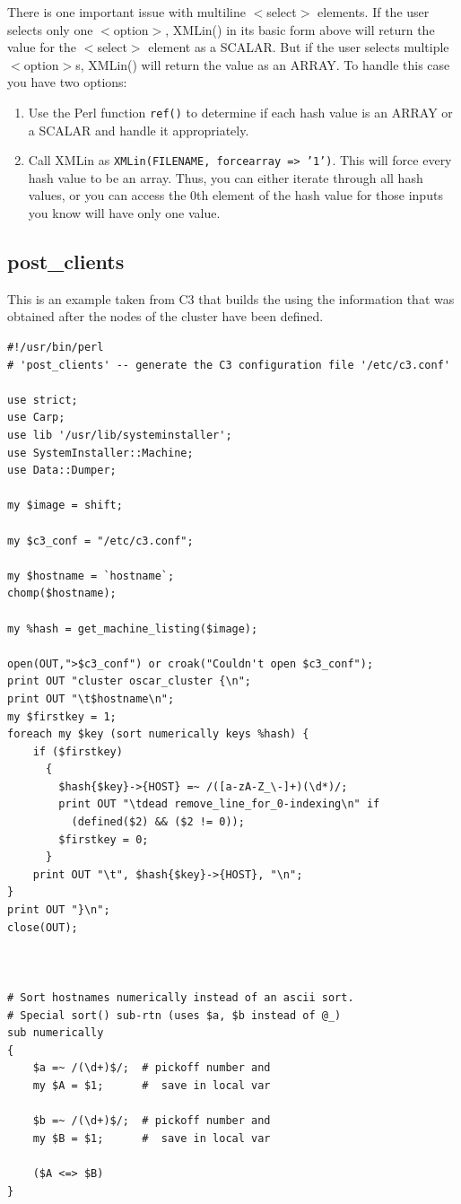 There is one important issue with multiline $<$select$>$ elements.  If the
user selects only one $<$option$>$, XMLin() in its basic form above will
return the value for the $<$select$>$ element as a SCALAR.  But if the user
selects multiple $<$option$>$s, XMLin() will return the value as an ARRAY.
To handle this case you have two options:

\begin{enumerate}
\item Use the Perl function \texttt{ref()} to determine if each hash value is
an ARRAY or a SCALAR and handle it appropriately.  
\item Call XMLin as \texttt{XMLin(FILENAME, forcearray => '1')}.  This will
force every hash value to be an array.  Thus, you can either iterate through
all hash values, or you can access the 0th element of the hash value for
those inputs you know will have only one value.
\end{enumerate}



\subsection{post\_clients}

This is an example taken from C3 that builds the  using
the information that was obtained after the nodes of the cluster have been
defined. 
\begin{scriptsize}
\begin{verbatim}
#!/usr/bin/perl
# 'post_clients' -- generate the C3 configuration file '/etc/c3.conf'

use strict;
use Carp;
use lib '/usr/lib/systeminstaller';
use SystemInstaller::Machine;
use Data::Dumper;

my $image = shift;

my $c3_conf = "/etc/c3.conf";

my $hostname = `hostname`;
chomp($hostname);

my %hash = get_machine_listing($image);

open(OUT,">$c3_conf") or croak("Couldn't open $c3_conf");
print OUT "cluster oscar_cluster {\n";
print OUT "\t$hostname\n";
my $firstkey = 1;
foreach my $key (sort numerically keys %hash) {
    if ($firstkey)
      {
        $hash{$key}->{HOST} =~ /([a-zA-Z_\-]+)(\d*)/;
        print OUT "\tdead remove_line_for_0-indexing\n" if 
          (defined($2) && ($2 != 0));
        $firstkey = 0;
      }
    print OUT "\t", $hash{$key}->{HOST}, "\n";
}
print OUT "}\n";
close(OUT);



# Sort hostnames numerically instead of an ascii sort.
# Special sort() sub-rtn (uses $a, $b instead of @_)
sub numerically
{
    $a =~ /(\d+)$/;  # pickoff number and
    my $A = $1;      #  save in local var

    $b =~ /(\d+)$/;  # pickoff number and
    my $B = $1;      #  save in local var

    ($A <=> $B)
}
\end{verbatim}
\end{scriptsize}


